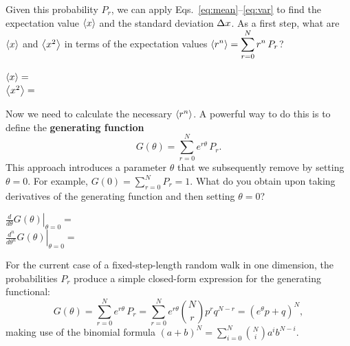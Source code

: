 \newpage %
Given this probability $P_r$, we can apply Eqs.~\ref{eq:mean}--\ref{eq:var} to find the expectation value $\left\langle x \right\rangle$ and the standard deviation $\Delta x$.
As a first step, what are $\left\langle x \right\rangle$ and $\left\langle x^2 \right\rangle$ in terms of the expectation values $\displaystyle \left\langle r^n \right\rangle = \sum_{r = 0}^N r^n \, P_r$?
\begin{mdframed}
  $\left\langle x \right\rangle   = $ \\[50 pt]
  $\left\langle x^2 \right\rangle = $ \\[50 pt]
\end{mdframed}
Now we need to calculate the necessary $\left\langle r^n \right\rangle$.
A powerful way to do this is to define the \textbf{generating function}
\begin{equation}
  G(\theta) = \sum_{r = 0}^N e^{r \theta} \, P_r.
\end{equation}
This approach introduces a parameter $\theta$ that we subsequently remove by setting $\theta = 0$.
For example, $G(0) = \sum_{r = 0}^N P_r = 1$.
What do you obtain upon taking derivatives of the generating function and then setting $\theta = 0$?
\begin{mdframed}
  $\displaystyle \left.\frac{d}{d\theta} G(\theta)\right|_{\theta = 0} = $ \\[50 pt]
  $\displaystyle \left.\frac{d^n}{d\theta^n} G(\theta)\right|_{\theta = 0} = $ \\[50 pt]
\end{mdframed}

For the current case of a fixed-step-length random walk in one dimension, the probabilities $P_r$ produce a simple closed-form expression for the generating functional:
\begin{equation}
  \label{eq:gen_func}
  G(\theta) = \sum_{r = 0}^N e^{r \theta} \, P_r = \sum_{r = 0}^N e^{r \theta} \binom{N}{r} p^r q^{N - r} = \left(e^{\theta} p + q\right)^N,
\end{equation}
making use of the binomial formula $\left(a + b\right)^N = \sum_{i = 0}^N \binom{N}{i} a^i b^{N - i}$.

